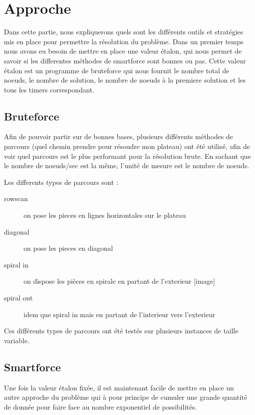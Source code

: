 \documentclass{article}
\begin{document}
	\section{Approche}

	Dans cette partie, nous expliquerons quels sont les différents outils et stratégies mis en place pour permettre la résolution du problème.
	Dans un premier temps nous avons eu besoin de mettre en place une valeur étalon, qui nous permet de savoir si les differentes méthodes de smartforce sont bonnes ou pas. Cette valeur étalon est un programme de bruteforce qui nous fournit le nombre total de noeuds, le nombre de solution, le nombre de noeuds à la premiere solution et les tous les timers correspondant.
	
	\subsection{Bruteforce}
	
	Afin de pouvoir partir sur de bonnes bases, plusieurs différents méthodes de parcours (quel chemin prendre pour résoudre mon plateau) ont été utilisé, afin de voir quel parcours est le plus performant pour la résolution brute. En sachant que le nombre de noeuds/sec est la même, l'unité de mesure est le nombre de noeuds.
	
	Les differents types de parcours sont :
	
	\begin{description}
		\item[rowscan] on pose les pieces en lignes horizontales sur le plateau
		\item[diagonal] on pose les pieces en diagonal
		\item[spiral in] on dispose les pièces en spirale en partant de l'exterieur [image]
		\item[spiral out] idem que spiral in mais en partant de l'interieur vers l'exterieur
	\end{description}
	
	Ces différents types de parcours ont été testés sur plusieurs instances de taille variable. 
	
	\subsection{Smartforce}
	
	Une fois la valeur étalon fixée, il est maintenant facile de mettre en place un autre approche du problème qui à pour principe de cumuler une grande quantité de donnée pour faire face au nombre exponentiel de possibilités.
	
\end{document}
